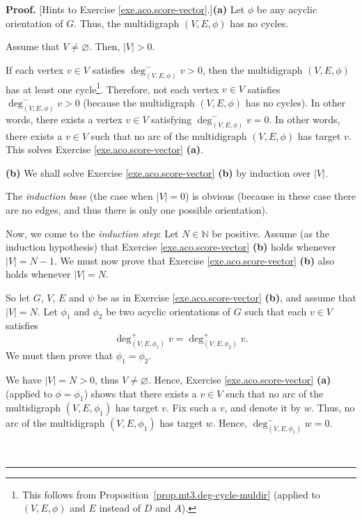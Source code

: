 \documentclass[numbers=enddot,12pt,final,onecolumn,notitlepage]{scrartcl}%
\theoremstyle{definition}
\newenvironment{proof}[1][Proof]{\noindent\textbf{#1.} }{\ \rule{0.5em}{0.5em}}
\newcommand{\tup}[1]{\left( #1 \right)}
\begin{document}
\begin{proof}
[Hints to Exercise \ref{exe.aco.score-vector}.]\textbf{(a)} Let $\phi$ be any
acyclic orientation of $G$. Thus, the multidigraph $\left(  V,E,\phi\right)  $
has no cycles.

Assume that $V\neq\varnothing$. Then, $\left\vert V\right\vert >0$.

If each vertex $v\in V$ satisfies $\deg_{\left(  V,E,\phi\right)  }^{-}v>0$,
then the multidigraph $\left(  V,E,\phi\right)  $ has at least one
cycle\footnote{This follows from
Proposition~\ref{prop.mt3.deg-cycle-muldir} (applied to
$\tup{V, E, \phi}$ and $E$ instead of $D$ and $A$).}.
Therefore, not each vertex $v\in V$ satisfies $\deg_{\left(
V,E,\phi\right)  }^{-}v>0$ (because the multidigraph $\left(  V,E,\phi\right)
$ has no cycles). In other words, there exists a vertex $v\in V$ satisfying
$\deg_{\left(  V,E,\phi\right)  }^{-}v=0$. In other words, there exists a
$v\in V$ such that no arc of the multidigraph $\left(  V,E,\phi\right)  $ has
target $v$. This solves Exercise \ref{exe.aco.score-vector} \textbf{(a)}.

\textbf{(b)} We shall solve Exercise \ref{exe.aco.score-vector} \textbf{(b)}
by induction over $\left\vert V\right\vert $.

The \textit{induction base} (the case when $\left\vert V\right\vert =0$) is
obvious (because in these case there are no edges, and thus there is only one
possible orientation).

Now, we come to the \textit{induction step}: Let $N\in\mathbb{N}$ be positive.
Assume (as the induction hypothesis) that Exercise \ref{exe.aco.score-vector}
\textbf{(b)} holds whenever $\left\vert V\right\vert =N-1$. We must now prove
that Exercise \ref{exe.aco.score-vector} \textbf{(b)} also holds whenever
$\left\vert V\right\vert =N$.

So let $G$, $V$, $E$ and $\psi$ be as in Exercise \ref{exe.aco.score-vector}
\textbf{(b)}, and assume that $\left\vert V\right\vert =N$. Let $\phi_{1}$ and
$\phi_{2}$ be two acyclic orientations of $G$ such that each $v\in V$
satisfies
\begin{equation}
\deg_{\left(  V,E,\phi_{1}\right)  }^{+}v=\deg_{\left(  V,E,\phi_{2}\right)
}^{+}v. \label{sol.aco.score-vector.b.1}%
\end{equation}
We must then prove that $\phi_{1}=\phi_{2}$.

We have $\left\vert V\right\vert =N>0$, thus $V\neq\varnothing$. Hence,
Exercise \ref{exe.aco.score-vector} \textbf{(a)} (applied to $\phi=\phi_{1}$)
shows that there exists a $v\in V$ such that no arc of the multidigraph
$\left(  V,E,\phi_{1}\right)  $ has target $v$. Fix such a $v$, and denote it
by $w$. Thus, no arc of the multidigraph $\left(  V,E,\phi_{1}\right)  $ has
target $w$. Hence, $\deg_{\left(  V,E,\phi_{1}\right)  }^{-}w=0$.


\end{proof}
\end{document}

